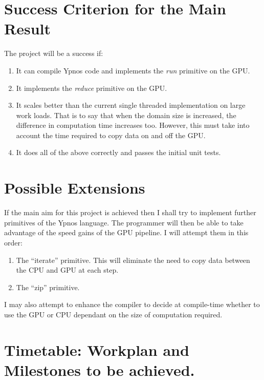 \section*{Success Criterion for the Main Result}

The project will be a success if:

\begin{enumerate}

\item It can compile Ypnos code and implements the \emph{run} primitive on the 
GPU.

\item It implements the \emph{reduce} primitive on the GPU.

\item It scales better than the current single threaded implementation on large 
work loads. That is to say that when the domain size is increased, the 
difference in computation time increases too. However, this must take into 
account the time required to copy data on and off the GPU.

\item It does all of the above correctly and passes the initial unit tests.

\end{enumerate}

\section*{Possible Extensions}

If the main aim for this project is achieved then I shall try to implement 
further primitives of the Ypnos language. The programmer will then be able to 
take advantage of the speed gains of the GPU pipeline. I will attempt them in 
this order:

\begin{enumerate}

\item The ``iterate'' primitive. This will eliminate the need to copy data 
between the CPU and GPU at each step.

\item The ``zip'' primitive.

\end{enumerate}

I may also attempt to enhance the compiler to decide at compile-time whether to 
use the GPU or CPU dependant on the size of computation required.

\section*{Timetable: Workplan and Milestones to be achieved.}


